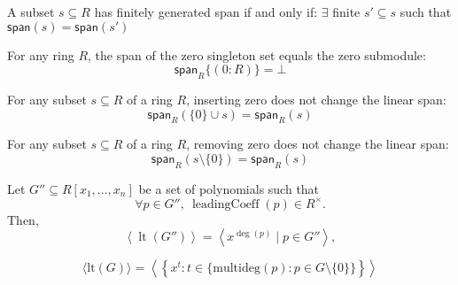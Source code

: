 \begin{lemma}\label{Ideal.fg_span_iff_fg_span_finset_subset}

  A subset $s \subseteq R$ has finitely generated span if and only if:
$\exists$ finite $s' \subseteq s$ such that $\mathsf{span}(s) = \mathsf{span}(s')$

\end{lemma}

\begin{lemma}\label{Ideal.span_singleton_zero}
  \leanok
  For any ring \( R \), the span of the zero singleton set equals the zero submodule:
\[
\mathsf{span}_R \{(0 : R)\} = \bot
\]

\end{lemma}

\begin{lemma}\label{Ideal.span_insert_zero}
  \leanok
  For any subset $s \subseteq R$ of a ring $R$, inserting zero does not change the linear span:
\[
\mathsf{span}_R(\{0\} \cup s) = \mathsf{span}_R(s)
\]

\end{lemma}

\begin{lemma}\label{Ideal.span_sdiff_singleton_zero}
  \leanok
  For any subset $s \subseteq R$ of a ring $R$, removing zero does not change the linear span:
\[
\mathsf{span}_R(s \setminus \{0\}) = \mathsf{span}_R(s)
\]

\end{lemma}

\begin{lemma}\label{MonomialOrder.leadingTerm_ideal_span_monomial}
  \leanok
  Let \( G'' \subseteq R[x_1, \dots, x_n] \) be a set of polynomials such that
\[
\forall p \in G'',\ \operatorname{leadingCoeff}(p) \in R^\times.
\]
Then,
\[
\left\langle \operatorname{lt}(G'') \right\rangle = \left\langle x^{\deg(p)} \mid p \in G'' \right\rangle,
\]

\end{lemma}

\begin{lemma}\label{MonomialOrder.leadingTerm_ideal_span_monomial'}
  \leanok
  \[
\langle \mathrm{lt}(G) \rangle = \left\langle \left\{ x^t : t \in \{ \mathrm{multideg}(p) : p \in G \setminus \{0\} \} \right\} \right\rangle
\]

\end{lemma}

